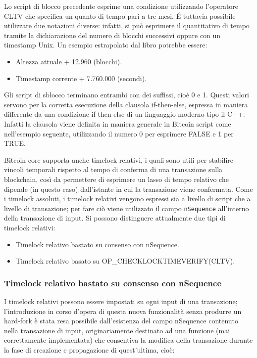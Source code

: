 Lo script di blocco precedente esprime una condizione utilizzando l’operatore CLTV che specifica un quanto di tempo pari a tre mesi. \'E tuttavia possibile utilizzare due notazioni diverse: infatti, si può esprimere il quantitativo di tempo tramite la dichiarazione del numero di blocchi successivi oppure con un timestamp Unix. Un esempio estrapolato dal libro \cite{bitcoinbook} potrebbe essere:
\begin{itemize}
  \item Altezza attuale + 12.960 (blocchi).
  \item Timestamp corrente + 7.760.000 (secondi).
\end{itemize}

Gli script di sblocco terminano entrambi con dei suffissi, cioè 0 e 1. Questi valori servono per la corretta esecuzione della clausola if-then-else, espressa in maniera differente da una condizione if-then-else di un linguaggio moderno tipo il C++. Infatti la clausola viene definita in maniera generale in Bitcoin script come nell’esempio seguente, utilizzando il numero 0 per esprimere FALSE e 1 per TRUE.



Bitcoin core supporta anche timelock relativi, i quali sono utili per stabilire vincoli temporali rispetto al tempo di conferma di una transazione sulla blockchain, così da permettere di esprimere un lasso di tempo relativo che dipende (in questo caso) dall’istante in cui la transazione viene confermata.
Come i timelock assoluti, i timelock relativi vengono espressi sia a livello di script che a livello di transazione; per fare ciò viene utilizzato il campo {\tt{nSequence}} all’interno della transazione di input.
Si possono distinguere attualmente due tipi di timelock relativi:

\begin{itemize}
  \item Timelock relativo bastato su consenso con nSequence.
  \item Timelock relativo basato su OP\_CHECKLOCKTIMEVERIFY(CLTV).
\end{itemize}

\subsubsection{Timelock relativo bastato su consenso con nSequence}
\label{sec:relativetimelock}
I timelock relativi possono essere impostati su ogni input di una transazione; l’introduzione in corso d’opera di questa nuova funzionalità senza produrre un hard-fork è stata resa possibile dall’esistenza del campo nSequence contenuto nella transazione di input, originariamente destinato ad una funzione (mai correttamente implementata) che consentiva la modifica della transazione durante la fase di creazione e propagazione di quest’ultima, cioè:

